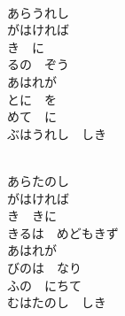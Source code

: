 \documentclass[10pt,b5j]{tarticle} %
\begin{document}
\vspace{1.5em} %
\newcommand{\linespace}{0.5em} %
\newcommand{\blocksize}{0.5\hsize} %
\newcommand{\itemmargin}{3em} %
\begin{enumerate} %
    \setlength{\itemindent}{\itemmargin} %
    \begin{minipage}[c]{\blocksize}
    
        \vspace{\linespace}
        \item~\\
        あらうれし\\
        がはければ\\
        き　に\\
        るの　ぞう\\
        あはれが\\
        とに　を\\
        めて　に\\
        ぶはうれし　しき
        
    \end{minipage}
    \begin{minipage}[c]{\blocksize}
        
        \vspace{\linespace}
        \item~\\
        あらたのし\\
        がはければ\\
        き　きに\\
        きるは　めどもきず\\
        あはれが\\
        びのは　なり\\
        ふの　にちて\\
        むはたのし　しき
    
    \end{minipage}
\end{enumerate} %
\end{document}
